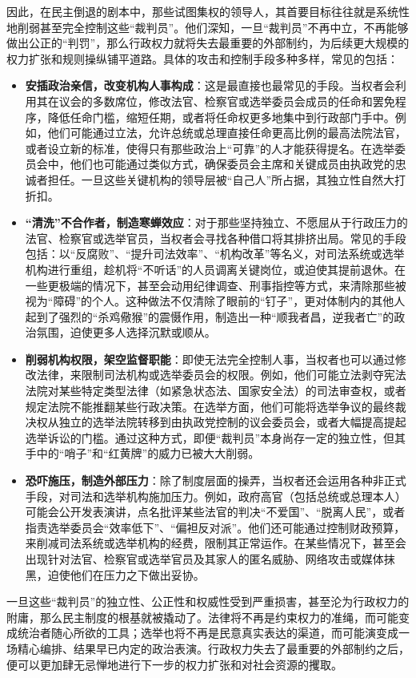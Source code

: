 \documentclass[UTF8, 10pt]{ctexbook}
\begin{document}
因此，在民主倒退的剧本中，那些试图集权的领导人，其首要目标往往就是系统性地削弱甚至完全控制这些“裁判员”。他们深知，一旦“裁判员”不再中立，不再能够做出公正的“判罚”，那么行政权力就将失去最重要的外部制约，为后续更大规模的权力扩张和规则操纵铺平道路。具体的攻击和控制手段多种多样，常见的包括：
\begin{itemize}
    \item \textbf{安插政治亲信，改变机构人事构成}：这是最直接也最常见的手段。当权者会利用其在议会的多数席位，修改法官、检察官或选举委员会成员的任命和罢免程序，降低任命门槛，缩短任期，或者将任命权更多地集中到行政部门手中。例如，他们可能通过立法，允许总统或总理直接任命更高比例的最高法院法官，或者设立新的标准，使得只有那些政治上“可靠”的人才能获得提名。在选举委员会中，他们也可能通过类似方式，确保委员会主席和关键成员由执政党的忠诚者担任。一旦这些关键机构的领导层被“自己人”所占据，其独立性自然大打折扣。
    \item \textbf{“清洗”不合作者，制造寒蝉效应}：对于那些坚持独立、不愿屈从于行政压力的法官、检察官或选举官员，当权者会寻找各种借口将其排挤出局。常见的手段包括：以“反腐败”、“提升司法效率”、“机构改革”等名义，对司法系统或选举机构进行重组，趁机将“不听话”的人员调离关键岗位，或迫使其提前退休。在一些更极端的情况下，甚至会动用纪律调查、刑事指控等方式，来清除那些被视为“障碍”的个人。这种做法不仅清除了眼前的“钉子”，更对体制内的其他人起到了强烈的“杀鸡儆猴”的震慑作用，制造出一种“顺我者昌，逆我者亡”的政治氛围，迫使更多人选择沉默或顺从。
    \item \textbf{削弱机构权限，架空监督职能}：即使无法完全控制人事，当权者也可以通过修改法律，来限制司法机构或选举委员会的权限。例如，他们可能立法剥夺宪法法院对某些特定类型法律（如紧急状态法、国家安全法）的司法审查权，或者规定法院不能推翻某些行政决策。在选举方面，他们可能将选举争议的最终裁决权从独立的选举法院转移到由执政党控制的议会委员会，或者大幅提高提起选举诉讼的门槛。通过这种方式，即便“裁判员”本身尚存一定的独立性，但其手中的“哨子”和“红黄牌”的威力已被大大削弱。
    \item \textbf{恐吓施压，制造外部压力}：除了制度层面的操弄，当权者还会运用各种非正式手段，对司法和选举机构施加压力。例如，政府高官（包括总统或总理本人）可能会公开发表演讲，点名批评某些法官的判决“不爱国”、“脱离人民”，或者指责选举委员会“效率低下”、“偏袒反对派”。他们还可能通过控制财政预算，来削减司法系统或选举机构的经费，限制其正常运作。在某些情况下，甚至会出现针对法官、检察官或选举官员及其家人的匿名威胁、网络攻击或媒体抹黑，迫使他们在压力之下做出妥协。
\end{itemize}
一旦这些“裁判员”的独立性、公正性和权威性受到严重损害，甚至沦为行政权力的附庸，那么民主制度的根基就被撬动了。法律将不再是约束权力的准绳，而可能变成统治者随心所欲的工具；选举也将不再是民意真实表达的渠道，而可能演变成一场精心编排、结果早已内定的政治表演。行政权力失去了最重要的外部制约之后，便可以更加肆无忌惮地进行下一步的权力扩张和对社会资源的攫取。
\end{document}
